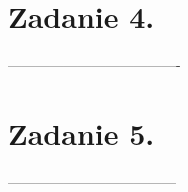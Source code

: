 \documentclass[polish,a4paper]{article}
\begin{document}
\section{Zadanie 4.}
-------------------------------------
%
%

\section{Zadanie 5.}
------------------------------------
%
\end{document}

